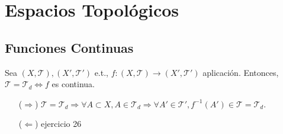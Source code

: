 \chapter{Espacios Topológicos}

\section{Funciones Continuas}

\begin{ejr}[27]
  Sea $( X, \mathcal{T} ), ( X', \mathcal{T}' )$ e.t., $f: ( X, \mathcal{T} ) \to ( X', \mathcal{T}' )$ aplicación. Entonces, $\mathcal{T} = \mathcal{T}_{d} \Leftrightarrow f$ es continua.
\end{ejr}

\begin{sol}
  \begin{enumerate}[label=(\roman*)]
    \item []
    \item [($\Rightarrow$)] $\mathcal{T} = \mathcal{T}_{d} \Rightarrow \forall A \subset X, A \in \mathcal{T}_{d} \Rightarrow \forall A' \in \mathcal{T}', f^{-1}(A') \in \mathcal{T} = \mathcal{T}_{d}$.
    \item [($\Leftarrow$)] ejercicio 26
  \end{enumerate}
\end{sol}
